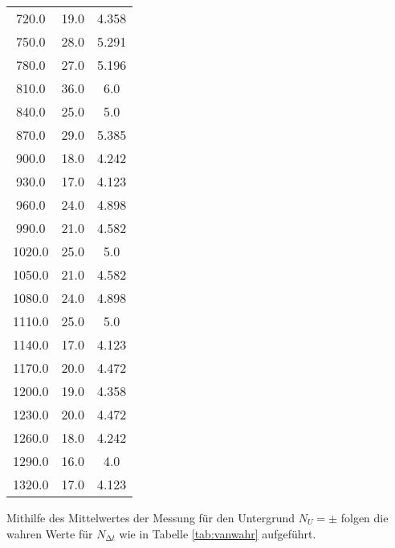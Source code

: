 \begin{table}
\begin{tabular}{c c c}
  720.0                & 19.0                 & 4.358  \\
  750.0                & 28.0                 & 5.291  \\
  780.0                & 27.0                 & 5.196  \\
  810.0                & 36.0                 & 6.0    \\
  840.0                & 25.0                 & 5.0    \\
  870.0                & 29.0                 & 5.385  \\
  900.0                & 18.0                 & 4.242  \\
  930.0                & 17.0                 & 4.123  \\
  960.0                & 24.0                 & 4.898  \\
  990.0                & 21.0                 & 4.582  \\
  1020.0               & 25.0                 & 5.0    \\
  1050.0               & 21.0                 & 4.582  \\
  1080.0               & 24.0                 & 4.898  \\
  1110.0               & 25.0                 & 5.0    \\
  1140.0               & 17.0                 & 4.123  \\
  1170.0               & 20.0                 & 4.472  \\
  1200.0               & 19.0                 & 4.358  \\
  1230.0               & 20.0                 & 4.472  \\
  1260.0               & 18.0                 & 4.242  \\
  1290.0               & 16.0                 & 4.0    \\
  1320.0               & 17.0                 & 4.123  \\
  \bottomrule
 \end{tabular}
\end{table}

\noindent Mithilfe des Mittelwertes der Messung für den Untergrund $N_U = \pm $
folgen die wahren Werte für $N_{\increment t}$ wie in Tabelle \ref{tab:vanwahr} 
aufgeführt.

